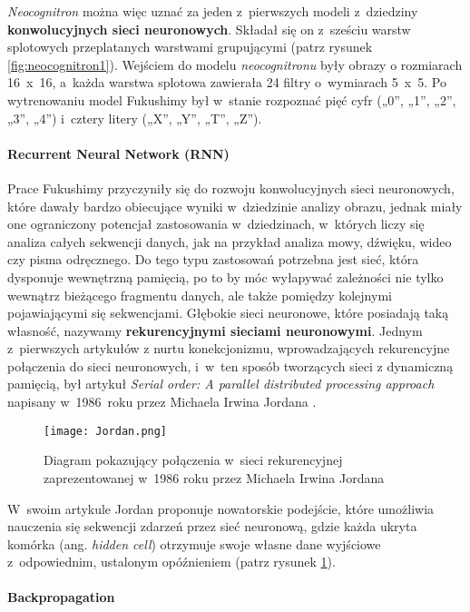 \emph{Neocognitron} można więc uznać za jeden z~pierwszych modeli z~dziedziny \textbf{konwolucyjnych sieci neuronowych}. Składał się on z~sześciu warstw splotowych przeplatanych warstwami grupującymi (patrz rysunek \ref{fig:neocognitron1}). Wejściem do modelu \textit{neocognitronu} były obrazy o rozmiarach 16~x~16, a~każda warstwa splotowa zawierała 24 filtry o~wymiarach 5~x~5. Po wytrenowaniu model Fukushimy był w~stanie rozpoznać pięć cyfr („0”, „1”, „2”, „3”, „4”) i~cztery litery („X”, „Y”, „T”, „Z”).

\paragraph*{Recurrent Neural Network (RNN)}

Prace Fukushimy przyczyniły się do rozwoju konwolucyjnych sieci neuronowych, które dawały bardzo obiecujące wyniki w~dziedzinie analizy obrazu, jednak miały one ograniczony potencjał zastosowania w~dziedzinach, w~których liczy się analiza całych sekwencji danych, jak na przykład analiza mowy, dźwięku, wideo czy pisma odręcznego. Do tego typu zastosowań potrzebna jest sieć, która dysponuje wewnętrzną pamięcią, po to by móc wyłapywać zależności nie tylko wewnątrz bieżącego fragmentu danych, ale także pomiędzy kolejnymi pojawiającymi się sekwencjami. Głębokie sieci neuronowe, które posiadają taką własność, nazywamy \textbf{rekurencyjnymi sieciami neuronowymi}. Jednym z~pierwszych artykułów z nurtu konekcjonizmu, wprowadzających rekurencyjne połączenia do sieci neuronowych, i~w~ten sposób tworzących sieci z dynamiczną pamięcią, był artykuł \emph{Serial order: A parallel distributed processing approach} napisany w~1986~roku przez Michaela Irwina Jordana \cite{jordan}. 

\begin{figure}[!h]
    \centering \texttt{[image: Jordan.png]}
    \captionsetup{format=hang}
    \caption{Diagram pokazujący połączenia w~sieci rekurencyjnej zaprezentowanej w~1986 roku przez Michaela Irwina Jordana \cite{jordan}}
    \label{fig:jordan1}
\end{figure}

W~swoim artykule Jordan proponuje nowatorskie podejście, które umożliwia nauczenia się sekwencji zdarzeń przez sieć neuronową, gdzie każda ukryta komórka (ang. \emph{hidden cell}) otrzymuje swoje własne dane wyjściowe z~odpowiednim, ustalonym opóźnieniem (patrz rysunek \ref{fig:jordan1}).

\paragraph*{Backpropagation}

